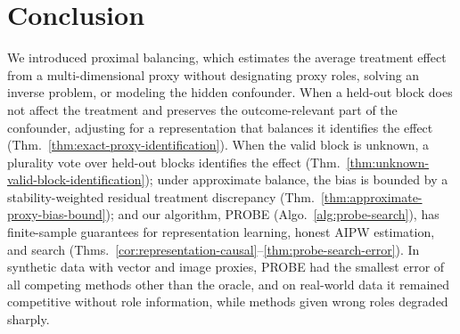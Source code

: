 \section{Conclusion}
\label{sec:main-conclusion}

We introduced proximal balancing, which estimates the average treatment effect from a multi-dimensional proxy without designating proxy roles, solving an inverse problem, or modeling the hidden confounder. When a held-out block does not affect the treatment and preserves the outcome-relevant part of the confounder, adjusting for a representation that balances it identifies the effect (Thm.~\ref{thm:exact-proxy-identification}). When the valid block is unknown, a plurality vote over held-out blocks identifies the effect (Thm.~\ref{thm:unknown-valid-block-identification}); under approximate balance, the bias is bounded by a stability-weighted residual treatment discrepancy (Thm.~\ref{thm:approximate-proxy-bias-bound}); and our algorithm, PROBE (Algo.~\ref{alg:probe-search}), has finite-sample guarantees for representation learning, honest AIPW estimation, and search (Thms.~\ref{cor:representation-causal}--\ref{thm:probe-search-error}). In synthetic data with vector and image proxies, PROBE had the smallest error of all competing methods other than the oracle, and on real-world data it remained competitive without role information, while methods given wrong roles degraded sharply.
